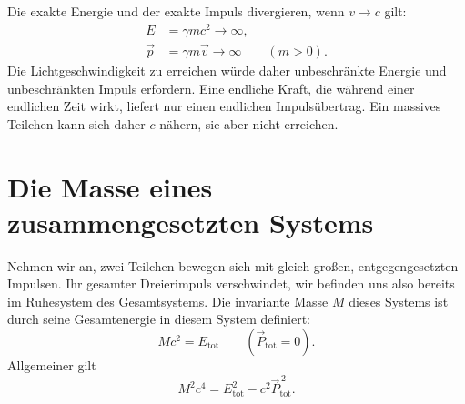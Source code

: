 \begin{classroomqa}
\end{classroomqa}

Die exakte Energie und der exakte Impuls divergieren, wenn \(v\to c\) gilt:
\begin{equation}
\begin{aligned}
E&=\gamma mc^2\longrightarrow\infty,\\
\vec p&=\gamma m\vec v\longrightarrow\infty
\qquad(m>0).
\end{aligned}
\end{equation}
Die Lichtgeschwindigkeit zu erreichen würde daher unbeschränkte Energie und unbeschränkten Impuls erfordern. Eine endliche Kraft, die während einer endlichen Zeit wirkt, liefert nur einen endlichen Impulsübertrag. Ein massives Teilchen kann sich daher \(c\) nähern, sie aber nicht erreichen.

\begin{classroomqa}
\end{classroomqa}

\section{Die Masse eines zusammengesetzten Systems}

Nehmen wir an, zwei Teilchen bewegen sich mit gleich großen, entgegengesetzten Impulsen. Ihr gesamter Dreierimpuls verschwindet, wir befinden uns also bereits im Ruhesystem des Gesamtsystems. Die invariante Masse \(M\) dieses Systems ist durch seine Gesamtenergie in diesem System definiert:
\begin{equation}
Mc^2=E_{\mathrm{tot}}
\qquad
(\vec P_{\mathrm{tot}}=0).
\end{equation}
Allgemeiner gilt
\begin{equation}
M^2c^4
=
E_{\mathrm{tot}}^2-c^2\vec P_{\mathrm{tot}}^{\,2}.
\label{eq:sr3-composite-mass}
\end{equation}

